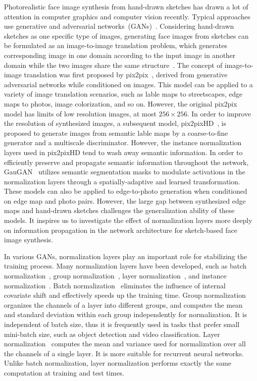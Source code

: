 \documentclass{article}
\begin{document}
Photorealistic face image synthesis from hand-drawn sketches has drawn a lot of attention in computer graphics and computer vision recently. Typical approaches use generative and adversarial networks~(GANs)~\cite{gan}. 
Considering hand-drawn sketches as one specific type of images, generating face images from sketches can be formulated as an image-to-image translation problem, which generates corresponding image in one domain according to the input image in another domain while the two images share the same structure~\cite{cyclegan,bicyclegan,spagan,munit,crn,cfgan,sis,cfgan,maskgan}.
The concept of image-to-image translation was first proposed by pix2pix~\cite{pix2pix}, derived from generative adversarial networks while conditioned on images. This model can be applied to a variety of image translation scenarios, such as lable maps to streetscapes, edge maps to photos, image colorization, and so on.
However, the original pix2pix model has limits of low resolution images, at most $256 \times 256$. In order to improve the resolution of synthesized images, a subsequent model, pix2pixHD~\cite{pix2pixhd}, is proposed to generate images from semantic lable maps by a coarse-to-fine generator and a multiscale discriminator. 
However, the instance normalization layers used in pix2pixHD tend to wash away semantic information.
In order to efficiently preserve and propagate semantic information throughout the network, GauGAN~\cite{spade} utilizes semantic segmentation masks to modulate activations in the normalization layers through a spatially-adaptive and learned transformation. 
%
These models can also be applied to edge-to-photo generation when conditioned on edge map and photo pairs. 
However, the large gap between synthesized edge maps and hand-drawn sketches challenges the generalization ability of these models.
%
It inspires us to investigate the effect of normalization layers more deeply on information propagation in the network architecture for sketch-based face image synthesis.


In various GANs, normalization layers play an important role for stabilizing the training process. Many normalization layers have been developed, such as batch normalization~\cite{bn}, group normalization~\cite{gn}, layer normalization~\cite{ln}, and instance normalization~\cite{instance_norm}. 
Batch normalization~\cite{bn} eliminates the influence of internal covariate shift and effectively speeds up the training time. 
Group normalization~\cite{gn} organizes the channels of a layer into different groups, and computes the mean and standard deviation within each group independently for normalization. It is independent of batch size, thus it is frequently used in tasks that prefer small mini-batch size, such as object detection and video classification.
Layer normalization~\cite{ln} computes the mean and variance used for normalization over all the channels of a single layer. It is more suitable for recurrent neural networks. Unlike batch normalization, layer normalization performs exactly the same computation at training and test times.
\end{document}
